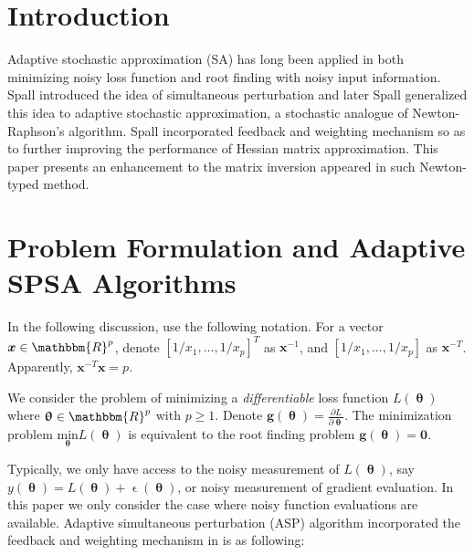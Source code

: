 \documentclass[conference]{IEEEtran}
\begin{document}
\section{Introduction}
Adaptive stochastic approximation (SA) has long been applied in both minimizing noisy loss function and root finding with noisy input information. Spall \cite{Spall1992} introduced the idea of simultaneous perturbation and later Spall \cite{Spall2000} generalized this idea to adaptive stochastic approximation, a stochastic analogue of Newton-Raphson's algorithm. Spall \cite{Spall2009} incorporated feedback and weighting mechanism so as to further improving the performance of Hessian matrix approximation. This paper presents an enhancement to the matrix inversion appeared in such Newton-typed method.

\section{Problem Formulation and Adaptive SPSA Algorithms}
In the following discussion, use the following notation. For a vector $ \bm{x}\in \mathbbm{R}^p $, denote $ [1/x_1, ..., 1/x_p]^T $ as $ \bm{x}^{-1} $, and $ [1/x_1, ..., 1/x_p] $ as $ \bm{x}^{-T} $. Apparently, $ \bm{x}^{-T}\bm{x}=p $.


We consider the problem of minimizing a \textit{differentiable} loss function $ L(\bm{\uptheta}) $ where $ \bm{\uptheta} \in \mathbbm{R}^p $ with $ p\ge1 $. Denote $\bm{g}(\bm{\uptheta})=\frac{\partial L}{\partial \bm{\uptheta}}$. The minimization problem $\underset{\bm{\uptheta}}{\text{min}}L(\bm{\uptheta})$ is equivalent to the root finding problem $\bm{g}(\bm{\uptheta})=\bm{0}$.


Typically, we only have access to the noisy measurement of $ L(\bm{\uptheta}) $, say $ y(\bm{\uptheta})=L(\bm{\uptheta})+\upvarepsilon(\bm{\uptheta}) $, or noisy measurement of gradient evaluation. In this paper we only consider the case where noisy function evaluations are available. Adaptive simultaneous perturbation (ASP) algorithm incorporated the feedback and weighting mechanism in \cite{Spall2009} is as following:
\end{document}
